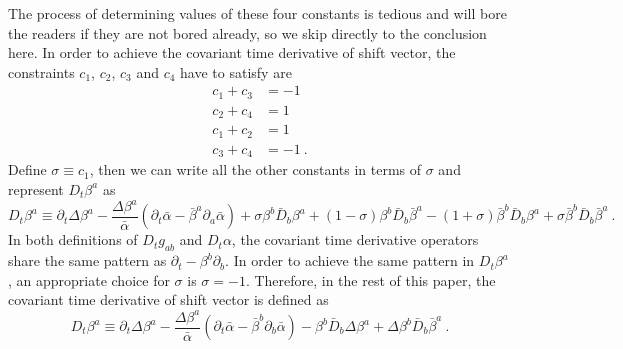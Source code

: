 The process of determining values of these four constants is tedious and will bore the readers if they are not bored already, so we skip directly to the conclusion here. In order to achieve the covariant time derivative of shift vector, the constraints $c_{1}$, $c_{2}$, $c_{3}$ and $c_{4}$ have to satisfy are
\begin{align*}
c_{1} + c_{3} & = -1\\
c_{2} + c_{4} & = 1\\
c_{1} + c_{2} & = 1\\
c_{3} + c_{4} & = -1 \ .
\end{align*}
Define $\sigma \equiv c_{1}$, then we can write all the other constants in terms of $\sigma$ and represent $D_{t}\beta^{a}$ as
\begin{equation}
	D_{t}\beta^{a} \equiv \partial_{t}\Delta \beta^{a} - \frac{\Delta \beta^{a}}{{\bar \alpha}}\left(\partial_{t}{\bar \alpha} - {\bar \beta}^{a}\partial_{a}{\bar \alpha}\right) + \sigma\beta^{b}{\bar D}_{b}\beta^{a} + \left(1-\sigma\right)\beta^{b}{\bar D}_{b}{\bar \beta}^{a} - \left(1 + \sigma\right){\bar \beta}^{b}{\bar D}_{b}\beta^{a} + \sigma{\bar \beta}^{b}{\bar D}_{b}{\bar \beta}^{a} \ .
\end{equation}
In both definitions of $D_{t}g_{ab}$ and $D_{t}\alpha$, the covariant time derivative operators share the same pattern as $\partial_{t} - \beta^{b}\partial_{b}$. In order to achieve the same pattern in $D_{t}\beta^{a}$, an appropriate choice for $\sigma$ is $\sigma = -1$. Therefore, in the rest of this paper, the covariant time derivative of shift vector is defined as
\begin{equation}
	D_{t}\beta^{a} \equiv \partial_{t}\Delta \beta^{a} - \frac{\Delta \beta^{a}}{{\bar \alpha}}\left(\partial_{t}{\bar \alpha} - {\bar \beta}^{b}\partial_{b}{\bar \alpha}\right) - \beta^{b}{\bar D}_{b}\Delta \beta^{a} + \Delta \beta^{b}{\bar D}_{b}{\bar \beta}^{a} \ .	
\end{equation}

